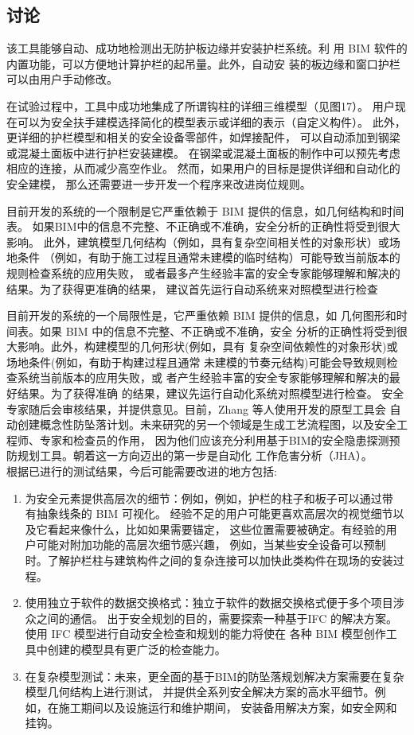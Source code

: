 \newpage
\subsection{讨论}

该工具能够自动、成功地检测出无防护板边缘并安装护栏系统。利
用 BIM 软件的内置功能，可以方便地计算护栏的起吊量。此外，自动安
装的板边缘和窗口护栏可以由用户手动修改。

在试验过程中，工具中成功地集成了所谓钩柱的详细三维模型（见图17）。
用户现在可以为安全扶手建模选择简化的模型表示或详细的表示（自定义构件）。
此外，更详细的护栏模型和相关的安全设备零部件，如焊接配件，
可以自动添加到钢梁或混凝土面板中进行护栏安装建模。
在钢梁或混凝土面板的制作中可以预先考虑相应的连接，从而减少高空作业。
然而，如果用户的目标是提供详细和自动化的安全建模，
那么还需要进一步开发一个程序来改进岗位规则。

目前开发的系统的一个限制是它严重依赖于 BIM 提供的信息，如几何结构和时间表。
如果BIM中的信息不完整、不正确或不准确，安全分析的正确性将受到很大影响。
此外，建筑模型几何结构（例如，具有复杂空间相关性的对象形状）或场地条件
（例如，有助于施工过程且通常未建模的临时结构）可能导致当前版本的规则检查系统的应用失败，
或者最多产生经验丰富的安全专家能够理解和解决的结果。为了获得更准确的结果，
建议首先运行自动系统来对照模型进行检查


目前开发的系统的一个局限性是，它严重依赖 BIM 提供的信息，如
几何图形和时间表。如果 BIM 中的信息不完整、不正确或不准确，安全
分析的正确性将受到很大影响。此外，构建模型的几何形状(例如，具有
复杂空间依赖性的对象形状)或场地条件(例如，有助于构建过程且通常
未建模的节奏元结构)可能会导致规则检查系统当前版本的应用失败，或
者产生经验丰富的安全专家能够理解和解决的最好结果。为了获得准确
的结果，建议先运行自动化系统对照模型进行检查。
安全专家随后会审核结果，并提供意见。目前，Zhang 等人使用开发的原型工具会
自动创建概念性防坠落计划。未来研究的另一个领域是生成工艺流程图，以及安全工程师、专家和检查员的作用，
因为他们应该充分利用基于BIM的安全隐患探测预防规划工具。朝着这一方向迈出的第一步是自动化
工作危害分析（JHA）。\\

根据已进行的测试结果，今后可能需要改进的地方包括:

\begin{enumerate}
    \item 为安全元素提供高层次的细节：例如，例如，护栏的柱子和板子可以通过带
    有抽象线条的 BIM 可视化。
    经验不足的用户可能更喜欢高层次的视觉细节以及它看起来像什么，比如如果需要锚定，
    这些位置需要被确定。有经验的用户可能对附加功能的高层次细节感兴趣，
    例如，当某些安全设备可以预制时。了解护栏柱与建筑构件之间的复杂连接可以加快此类构件在现场的安装过程。
    \item 使用独立于软件的数据交换格式：独立于软件的数据交换格式便于多个项目涉众之间的通信。
    出于安全规划的目的，需要探索一种基于IFC 的解决方案。
    使用 IFC 模型进行自动安全检查和规划的能力将使在
    各种 BIM 模型创作工具中创建的模型具有更广泛的检查能力。
    \item 在复杂模型测试：未来，更全面的基于BIM的防坠落规划解决方案需要在复杂模型几何结构上进行测试，
    并提供全系列安全解决方案的高水平细节。例如，在施工期间以及设施运行和维护期间，
    安装备用解决方案，如安全网和挂钩。
\end{enumerate}